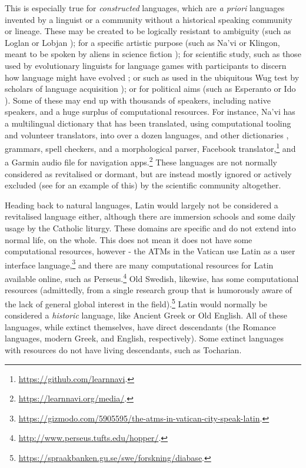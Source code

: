 This is especially true for \textit{constructed} languages, which are \textit{a priori} languages invented by a linguist or a community without a historical speaking community or lineage. These may be created to be logically resistant to ambiguity (such as Loglan or Lobjan \citep{okrent2009land}); for a specific artistic purpose (such as Na'vi or Klingon, meant to be spoken by aliens in science fiction \citep{schreyer2015digital, schreyer2011media}); for scientific study, such as those used by evolutionary linguists for language games with participants to discern how language might have evolved \citep{scott2010language}; or such as used in the ubiquitous Wug test by scholars of language acquisition \citep{ratner2000beginning}); or for political aims (such as Esperanto or Ido \citep{okrent2009land}). Some of these may end up with thousands of speakers, including native speakers, and a huge surplus of computational resources. For instance, Na'vi has a multilingual dictionary \citep{navidictionary} that has been translated, using computational tooling and volunteer translators, into over a dozen languages, and other dictionaries \citep{wmannis}, grammars, spell checkers, and a morphological parser, Facebook translator,\footnote{\href{https://github.com/learnnavi}{https://github.com/learnnavi}. } and a Garmin audio file for navigation apps.\footnote{\href{https://learnnavi.org/media/}{https://learnnavi.org/media/}. } These languages are not normally considered as revitalised or dormant, but are instead mostly ignored or actively excluded (see \citet{gibson2016assessing} for an example of this) by the scientific community altogether.

Heading back to natural languages, Latin would largely not be considered a revitalised language either, although there are immersion schools and some daily usage by the Catholic liturgy. These domains are specific and do not extend into normal life, on the whole. This does not mean it does not have some computational resources, however - the ATMs in the Vatican use Latin as a user interface language,\footnote{\href{https://gizmodo.com/5905595/the-atms-in-vatican-city-speak-latin}{https://gizmodo.com/5905595/the-atms-in-vatican-city-speak-latin}. } and there are many computational resources for Latin available online, such as Perseus.\footnote{\href{http://www.perseus.tufts.edu/hopper/}{http://www.perseus.tufts.edu/hopper/}. } Old Swedish, likewise, has some computational resources (admittedly, from a single research group that is humorously aware of the lack of general global interest in the field).\footnote{\href{https://spraakbanken.gu.se/swe/forskning/diabase}{https://spraakbanken.gu.se/swe/forskning/diabase}. } Latin would normally be considered a \textit{historic} language, like Ancient Greek or Old English. All of these languages, while extinct themselves, have direct descendants (the Romance languages, modern Greek, and English, respectively). Some extinct languages with resources do not have living descendants, such as Tocharian.

